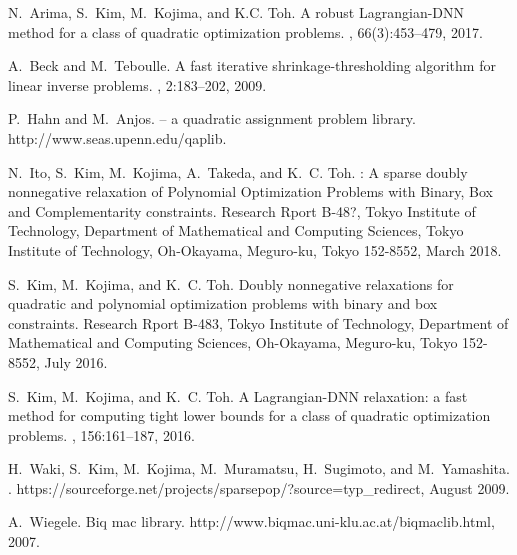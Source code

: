 \documentclass[12pt]{article}
\begin{document}



\begin{thebibliography}{1}

N.~Arima, S.~Kim, M.~Kojima, and K.C. Toh.
\newblock A robust \mbox{Lagrangian-DNN} method for a class of quadratic
  optimization problems.
, 66(3):453--479, 2017.

A.~Beck and M.~Teboulle.
\newblock A fast iterative shrinkage-thresholding algorithm for linear inverse
  problems.
, 2:183--202, 2009.

P.~Hahn and M.~Anjos.
 -- a quadratic assignment problem library.
\newblock http://www.seas.upenn.edu/qaplib.

N.~Ito, S.~Kim, M.~Kojima, A.~Takeda, and K.~C. Toh.
: {A} sparse doubly nonnegative relaxation of {P}olynomial
  {O}ptimization {P}roblems with {B}inary, {B}ox and {C}omplementarity
  constraints.
\newblock Research {R}port {B}-48?, {T}okyo {I}nstitute of {T}echnology,
  {D}epartment of {M}athematical and {C}omputing {S}ciences, {T}okyo
  {I}nstitute of {T}echnology, {O}h-{O}kayama, {M}eguro-ku, {T}okyo 152-8552,
  March 2018.

S.~Kim, M.~Kojima, and K.~C. Toh.
\newblock Doubly nonnegative relaxations for quadratic and polynomial
  optimization problems with binary and box constraints.
\newblock Research {R}port {B}-483, {T}okyo {I}nstitute of {T}echnology,
  {D}epartment of {M}athematical and {C}omputing {S}ciences, {O}h-{O}kayama,
  {M}eguro-ku, T{}okyo 152-8552, July 2016.

S.~Kim, M.~Kojima, and K.~C. Toh.
\newblock A {L}agrangian-{DNN} relaxation: a fast method for computing tight
  lower bounds for a class of quadratic optimization problems.
, 156:161--187, 2016.

H.~Waki, S.~Kim, M.~Kojima, M.~Muramatsu, H.~Sugimoto, and M.~Yamashita.
.
\newblock https://sourceforge.net/projects/sparsepop/?source={typ\_redirect},
  August 2009.

A.~Wiegele.
\newblock Biq mac library.
\newblock http://www.biqmac.uni-klu.ac.at/biqmaclib.html, 2007.

\end{thebibliography}
\end{document}
